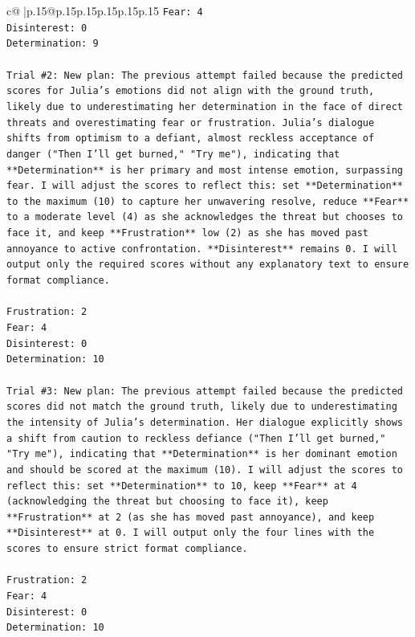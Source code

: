 \documentclass{article}
\begin{document}
{\begin{supertabular}{c@{$\;$}|p{.15\linewidth}@{}p{.15\linewidth}p{.15\linewidth}p{.15\linewidth}p{.15\linewidth}p{.15\linewidth}}
{{{\texttt{Fear: 4} \\
\texttt{Disinterest: 0} \\
\texttt{Determination: 9} \\
\\ 
\texttt{Trial \#2: New plan: The previous attempt failed because the predicted scores for Julia's emotions did not align with the ground truth, likely due to underestimating her determination in the face of direct threats and overestimating fear or frustration. Julia's dialogue shifts from optimism to a defiant, almost reckless acceptance of danger ("Then I'll get burned," "Try me"), indicating that **Determination** is her primary and most intense emotion, surpassing fear. I will adjust the scores to reflect this: set **Determination** to the maximum (10) to capture her unwavering resolve, reduce **Fear** to a moderate level (4) as she acknowledges the threat but chooses to face it, and keep **Frustration** low (2) as she has moved past annoyance to active confrontation. **Disinterest** remains 0. I will output only the required scores without any explanatory text to ensure format compliance.} \\
\\ 
\texttt{Frustration: 2} \\
\texttt{Fear: 4} \\
\texttt{Disinterest: 0} \\
\texttt{Determination: 10} \\
\\ 
\texttt{Trial \#3: New plan: The previous attempt failed because the predicted scores did not match the ground truth, likely due to underestimating the intensity of Julia's determination. Her dialogue explicitly shows a shift from caution to reckless defiance ("Then I'll get burned," "Try me"), indicating that **Determination** is her dominant emotion and should be scored at the maximum (10). I will adjust the scores to reflect this: set **Determination** to 10, keep **Fear** at 4 (acknowledging the threat but choosing to face it), keep **Frustration** at 2 (as she has moved past annoyance), and keep **Disinterest** at 0. I will output only the four lines with the scores to ensure strict format compliance.} \\
\\ 
\texttt{Frustration: 2} \\
\texttt{Fear: 4} \\
\texttt{Disinterest: 0} \\
\texttt{Determination: 10} \\
}}}
\end{supertabular}}
\end{document}
